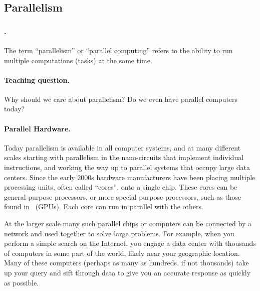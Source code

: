 \subsection{Parallelism}

\subsubsection{}

\paragraph{.}
The term ``parallelism'' or ``parallel computing'' refers to the
ability to run multiple computations (tasks) at the same time.
%

\paragraph{Teaching question.}
Why should we care about parallelism?  
%
Do we even have parallel computers today?

\paragraph{Parallel Hardware.}
Today parallelism is available in all computer systems, and at many
different scales starting with parallelism in the nano-circuits that
implement individual instructions, and working the way up to parallel
systems that occupy large data centers.  Since the early 2000s
hardware manufacturers have been placing multiple processing units,
often called ``cores'', onto a single chip.  These cores can be
general purpose processors, or more special purpose processors, such as
those found in~ (GPUs).  Each core can
run in parallel with the others.  

At the larger scale many such parallel chips or computers can be
connected by a network and used together to solve large problems.  For
example, when you perform a simple search on the Internet, you engage
a data center with thousands of computers in some part of the world,
likely near your geographic location.
%
Many of these computers (perhaps as many as hundreds, if not
thousands) take up your query and sift through data to give you an
accurate response as quickly as possible.



